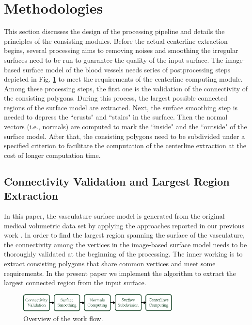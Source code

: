 
\section{Methodologies}
\label{sec5_3}

This section discusses the design of the processing pipeline and details the principles of the consisting modules.
Before the actual centerline extraction begins, several processing aims to removing noises and smoothing the irregular surfaces need to be run to guarantee the quality of the input surface.
The image-based surface model of the blood vessels needs series of postprocessing steps depicted in Fig. \ref{fig:DataFlow5} to meet the requirements of the centerline computing module. %
Among these processing steps, the first one is the validation of the connectivity of the consisting polygons.
During this process, the largest possible connected regions of the surface model are extracted.
Next, the surface smoothing step is needed to depress the ``crusts" and ``stairs" in the surface.
Then the normal vectors (i.e., normals) are computed to mark the ``inside" and the ``outside" of the surface model.
After that, the consisting polygons need to be subdivided under a specified criterion to facilitate the computation of the centerline extraction at the cost of longer computation time. %


\subsection{Connectivity Validation and Largest Region Extraction}

In this paper, the vasculature surface model is generated from the original medical volumetric data set by applying the approaches reported in our previous work \cite{Yang2014ICRA}. %
In order to find the largest region spanning the surface of the vasculature, the connectivity among the vertices in the image-based surface model needs to be thoroughly validated at the beginning of the processing. %
The inner working is to extract consisting polygons that share common vertices and meet some requirements.
In the present paper we implement the algorithm to extract the largest connected region from the input surface.
\begin{figure}[t]
\centering
\includegraphics[width=3.2in]{figures/chap05/DataFlow.eps}
\caption{Overview of the work flow.}
\label{fig:DataFlow5}
\end{figure}

